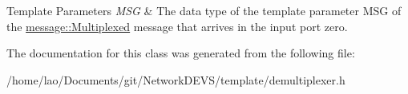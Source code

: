 \begin{DoxyTemplParams}{Template Parameters}
{\em M\+SG} & The data type of the template parameter M\+SG of the \hyperlink{structmessage_1_1Multiplexed}{message\+::\+Multiplexed} message that arrives in the input port zero. \\
\hline
\end{DoxyTemplParams}


The documentation for this class was generated from the following file\+:\begin{DoxyCompactItemize}
\item 
/home/lao/\+Documents/git/\+Network\+D\+E\+V\+S/template/demultiplexer.\+h\end{DoxyCompactItemize}
